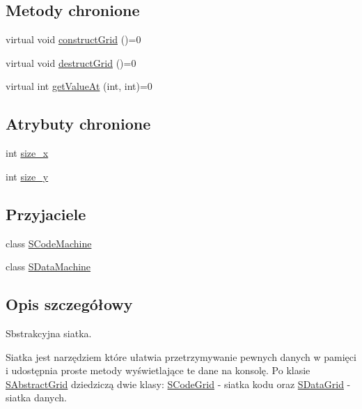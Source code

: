 \subsection*{Metody chronione}
\begin{CompactItemize}
\item 
virtual void \hyperlink{classSAbstractGrid_919248aad138ffb1c969e73c3e637dcd}{constructGrid} ()=0
\item 
virtual void \hyperlink{classSAbstractGrid_fb63d8cf5210c3606a3b7add19f06833}{destructGrid} ()=0
\item 
virtual int \hyperlink{classSAbstractGrid_d8772e08d58f970d885775cb9682bf6d}{getValueAt} (int, int)=0
\end{CompactItemize}
\subsection*{Atrybuty chronione}
\begin{CompactItemize}
\item 
int \hyperlink{classSAbstractGrid_f0b1916fda47bbd921fc1b5b5abadb72}{size\_\-x}
\item 
int \hyperlink{classSAbstractGrid_b9fddbe2004e7242dff69aa20da8a3c3}{size\_\-y}
\end{CompactItemize}
\subsection*{Przyjaciele}
\begin{CompactItemize}
\item 
\hypertarget{classSAbstractGrid_13f503f5e1b3625e973ac350880b3a31}{
class \hyperlink{classSAbstractGrid_13f503f5e1b3625e973ac350880b3a31}{SCodeMachine}}
\label{classSAbstractGrid_13f503f5e1b3625e973ac350880b3a31}

\item 
\hypertarget{classSAbstractGrid_b064517f75c184bae39efba1df818a12}{
class \hyperlink{classSAbstractGrid_b064517f75c184bae39efba1df818a12}{SDataMachine}}
\label{classSAbstractGrid_b064517f75c184bae39efba1df818a12}

\end{CompactItemize}


\subsection{Opis szczegółowy}
Sbstrakcyjna siatka. 

Siatka jest narzędziem które ułatwia przetrzymywanie pewnych danych w pamięci i udostępnia proste metody wyświetlające te dane na konsolę. Po klasie \hyperlink{classSAbstractGrid}{SAbstractGrid} dziedziczą dwie klasy: \hyperlink{classSCodeGrid}{SCodeGrid} - siatka kodu oraz \hyperlink{classSDataGrid}{SDataGrid} - siatka danych. 

